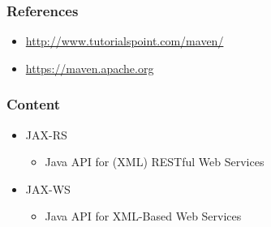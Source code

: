 \documentclass[10pt,xcolor=pdflatex]{beamer}
\begin{document}
\begin{frame}\frametitle{References}
\begin{itemize}
    \item \url{http://www.tutorialspoint.com/maven/}
    \item \url{https://maven.apache.org}
\end{itemize}
\end{frame}



\begin{frame}\frametitle{Content}
\begin{itemize}
	\item JAX-RS
       \begin{itemize}
         \item Java\texttrademark{} API for (XML) RESTful Web Services
       \end{itemize}
    \item JAX-WS
      \begin{itemize}
        \item Java\texttrademark{} API for XML-Based Web Services
      \end{itemize}
\end{itemize}
\end{frame}


\end{document}
